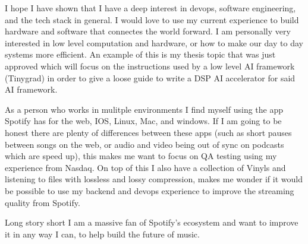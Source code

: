 \documentclass[../../main.tex]{subfiles}
\begin{document}
I hope I have shown that I have a deep interest in devops, software engineering, and the tech stack in general. I would love to use my current experience to build hardware and software that connectes the world forward. I am personally very interested in low level computation and hardware, or how to make our day to day systems more efficient. An example of this is my thesis topic that was just approved which will focus on the instructions used by a low level AI framework (Tinygrad) in order to give a loose guide to write a DSP AI accelerator for said AI framework.


As a person who works in mulitple environments I find myself using the app Spotify has for the web, IOS, Linux, Mac, and windows. If I am going to be honest there are plenty of differences between these apps (such as short pauses between songs on the web, or audio and video being out of sync on podcasts which are speed up), this makes me want to focus on QA testing using my experience from Nasdaq. On top of this I also have a collection of Vinyls and listening to files with lossless and lossy compression, makes me wonder if it would be possible to use my backend and devops experience to improve the streaming quality from Spotify.

Long story short I am a massive fan of Spotify's ecosystem and want to improve it in any way I can, to help build the future of music.
\\
\end{document}
